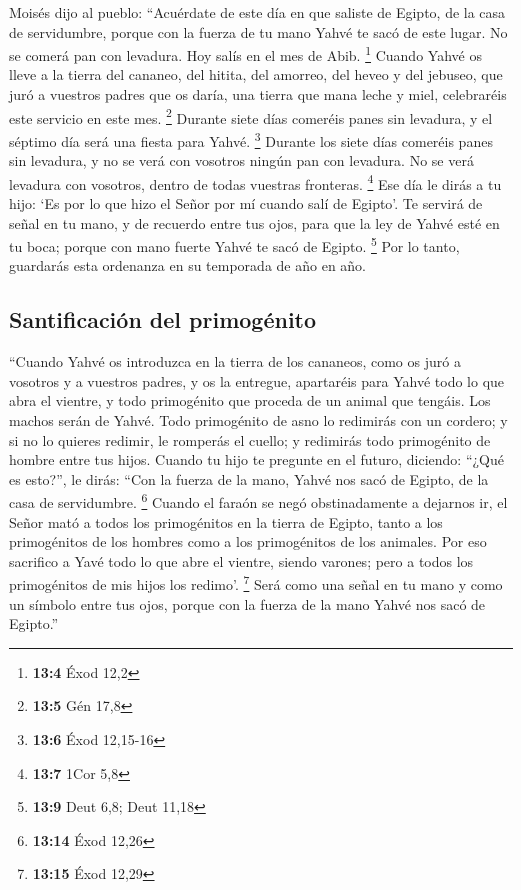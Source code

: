 \begin{paracol}{2}
 Moisés dijo al pueblo: ``Acuérdate de este día en que
saliste de Egipto, de la casa de servidumbre, porque con la fuerza de tu
mano Yahvé te sacó de este lugar. No se comerá pan con levadura.
 Hoy salís en el mes de Abib. \footnote{\textbf{13:4} Éxod
  12,2}  Cuando Yahvé os lleve a la tierra del cananeo,
del hitita, del amorreo, del heveo y del jebuseo, que juró a vuestros
padres que os daría, una tierra que mana leche y miel, celebraréis este
servicio en este mes. \footnote{\textbf{13:5} Gén 17,8} 
Durante siete días comeréis panes sin levadura, y el séptimo día será
una fiesta para Yahvé. \footnote{\textbf{13:6} Éxod 12,15-16}
 Durante los siete días comeréis panes sin levadura, y no
se verá con vosotros ningún pan con levadura. No se verá levadura con
vosotros, dentro de todas vuestras fronteras. \footnote{\textbf{13:7}
  1Cor 5,8}  Ese día le dirás a tu hijo: `Es por lo que
hizo el Señor por mí cuando salí de Egipto'.  Te servirá
de señal en tu mano, y de recuerdo entre tus ojos, para que la ley de
Yahvé esté en tu boca; porque con mano fuerte Yahvé te sacó de Egipto.
\footnote{\textbf{13:9} Deut 6,8; Deut 11,18}  Por lo
tanto, guardarás esta ordenanza en su temporada de año en año.

\hypertarget{santificaciuxf3n-del-primoguxe9nito}{%
\subsection{Santificación del
primogénito}\label{santificaciuxf3n-del-primoguxe9nito}}

 ``Cuando Yahvé os introduzca en la tierra de los
cananeos, como os juró a vosotros y a vuestros padres, y os la entregue,
 apartaréis para Yahvé todo lo que abra el vientre, y
todo primogénito que proceda de un animal que tengáis. Los machos serán
de Yahvé.  Todo primogénito de asno lo redimirás con un
cordero; y si no lo quieres redimir, le romperás el cuello; y redimirás
todo primogénito de hombre entre tus hijos.  Cuando tu
hijo te pregunte en el futuro, diciendo: ``¿Qué es esto?'', le dirás:
``Con la fuerza de la mano, Yahvé nos sacó de Egipto, de la casa de
servidumbre. \footnote{\textbf{13:14} Éxod 12,26}  Cuando
el faraón se negó obstinadamente a dejarnos ir, el Señor mató a todos
los primogénitos en la tierra de Egipto, tanto a los primogénitos de los
hombres como a los primogénitos de los animales. Por eso sacrifico a
Yavé todo lo que abre el vientre, siendo varones; pero a todos los
primogénitos de mis hijos los redimo'. \footnote{\textbf{13:15} Éxod
  12,29}  Será como una señal en tu mano y como un
símbolo entre tus ojos, porque con la fuerza de la mano Yahvé nos sacó
de Egipto.''


\end{paracol}
